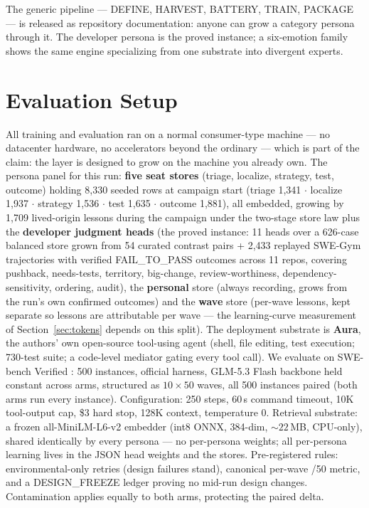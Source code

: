 \documentclass[11pt]{article}
\begin{document}
The generic pipeline --- DEFINE, HARVEST, BATTERY, TRAIN, PACKAGE --- is released as repository documentation: anyone can grow a category persona through it. The developer persona is the proved instance; a six-emotion family shows the same engine specializing from one substrate into divergent experts.

\section{Evaluation Setup}
\label{sec:setup}

All training and evaluation ran on a normal consumer-type machine --- no datacenter hardware, no accelerators beyond the ordinary --- which is part of the claim: the layer is designed to grow on the machine you already own. The persona panel for this run: \textbf{five seat stores} (triage, localize, strategy, test, outcome) holding 8{,}330 seeded rows at campaign start (triage 1{,}341 $\cdot$ localize 1{,}937 $\cdot$ strategy 1{,}536 $\cdot$ test 1{,}635 $\cdot$ outcome 1{,}881), all embedded, growing by 1{,}709 lived-origin lessons during the campaign under the two-stage store law plus the \textbf{developer judgment heads} (the proved instance: 11 heads over a 626-case balanced store grown from 54 curated contrast pairs + 2,433 replayed SWE-Gym trajectories with verified FAIL\_TO\_PASS outcomes across 11 repos, covering pushback, needs-tests, territory, big-change, review-worthiness, dependency-sensitivity, ordering, audit), the \textbf{personal} store (always recording, grows from the run's own confirmed outcomes) and the \textbf{wave} store (per-wave lessons, kept separate so lessons are attributable per wave --- the learning-curve measurement of Section~\ref{sec:tokens} depends on this split). The deployment substrate is \textbf{Aura}, the authors' own open-source tool-using agent (shell, file editing, test execution; 730-test suite; a code-level mediator gating every tool call). We evaluate on SWE-bench Verified \cite{jimenez2024swebench}: 500 instances, official harness, GLM-5.3 Flash backbone held constant across arms, structured as $10\times50$ waves, all 500 instances paired (both arms run every instance). Configuration: 250 steps, 60\,s command timeout, 10K tool-output cap, \$3 hard stop, 128K context, temperature 0. Retrieval substrate: a frozen all-MiniLM-L6-v2 embedder (int8 ONNX, 384-dim, ${\sim}22$\,MB, CPU-only), shared identically by every persona --- no per-persona weights; all per-persona learning lives in the JSON head weights and the stores. Pre-registered rules: environmental-only retries (design failures stand), canonical per-wave /50 metric, and a DESIGN\_FREEZE ledger proving no mid-run design changes. Contamination \cite{swebenchillusion2025,swebenchplus2024} applies equally to both arms, protecting the paired delta.
\end{document}
